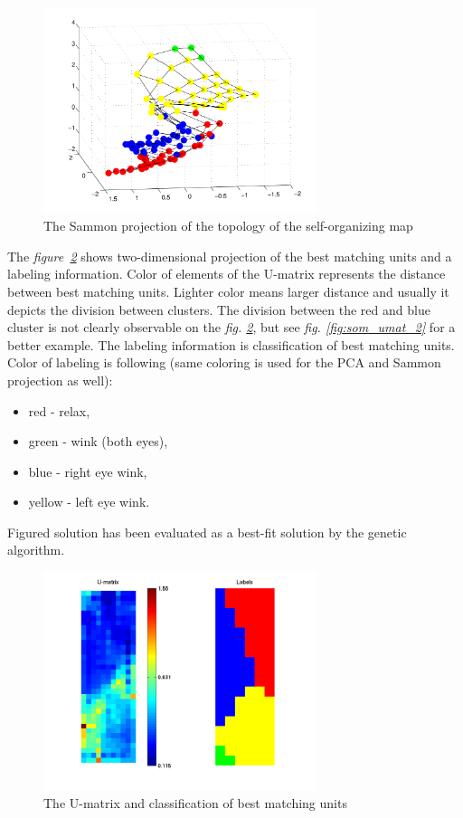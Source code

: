 \documentclass[a4paper]{IEEEtran}
\begin{document}
\begin{figure}[!h]
	\centering
	\includegraphics[width=80mm]{som_samon_proj}
	\caption{The Sammon projection of the topology of the self-organizing map}
	\label{fig:som_samon_proj}
\end{figure}

The \textit{figure~\ref{fig:som_umat}} shows two-dimensional projection of the best matching units and
a labeling information.
Color of elements of the U-matrix represents the distance between best matching units. Lighter color
means larger distance and usually it depicts the division between clusters.
The division between the red and blue cluster is not clearly observable on the \textit{fig. \ref{fig:som_umat}},
but see \textit{fig. \ref{fig:som_umat_2}} for a better example.
The labeling information is classification of best matching units. Color of labeling is following (same coloring is used
for the PCA and Sammon projection as well):
\begin{itemize}
	\item red - relax,
	\item green - wink (both eyes),
	\item blue - right eye wink,
	\item yellow - left eye wink.
\end{itemize}

Figured solution has been evaluated as a best-fit solution by the genetic algorithm.
\begin{figure}[!h]
	\centering
	\includegraphics[width=80mm]{som_umat}
	\caption{The U-matrix and classification of best matching units}
	\label{fig:som_umat}
\end{figure}
\end{document}
